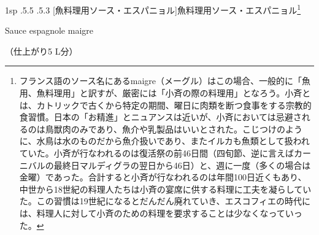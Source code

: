 \documentclass[14Q,a4paperpaper,]{ltjsbook}
\makeatletter
\renewcommand{\headfont}{\gtfamily\sffamily\bfseries}%
\let\footnotes@ve=\footnote
\def\footnote{\inhibitglue\footnotes@ve}
\newenvironment{recette}{\setlength{\parindent}{0pt}\begin{spacing}{0.8}\begin{multicols}{2}\setlength\topskip{.8\baselineskip}}{\end{multicols}\end{spacing}}
\newcommand{\medlarge}{\fontsize{11}{13}\selectfont}
\renewcommand{\subsubsection}{\@startsection{subsubsection}{3}{\z@}%
    {1sp \@plus.5\Cdp \@minus.5\Cdp}%
    {\if@slide .5\Cvs \@plus.3\Cdp \else \z@ \fi}%
    {\normalfont\medlarge\headfont\leftskip -1\zw}}
\newenvironment{frsubenv}{\begin{spacing}{0.2}\setlength{\leftskip}{-1\zw}\bfseries}{\end{spacing}\normalfont\normalsize\setlength{\leftskip}{0pt}\par\vspace{1.1\zw}}
\newcommand{\atoaki}{\vspace{1.25mm}}
\makeatother
\begin{document}
\begin{recette}
\atoaki{}

\hypertarget{sauce-espagnole-maigre}{%
\subsubsection[魚料理用ソース・エスパニョル]{\texorpdfstring{魚料理用ソース・エスパニョル\footnote{フランス語のソース名にあるmaigre（メーグル）はこの場合、一般的に「魚用、魚料理用」と訳すが、厳密には「小斉の際の料理用」となろう。小斉とは、カトリックで古くから特定の期間、曜日に肉類を断つ食事をする宗教的食習慣。日本の「お精進」とニュアンスは近いが、小斉においては忌避されるのは鳥獣肉のみであり、魚介や乳製品はいいとされた。こじつけのように、水鳥は水のものだから魚介扱いであり、またイルカも魚類として扱われていた。小斉が行なわれるのは復活祭の前46日間（四旬節、逆に言えばカーニバルの最終日マルディグラの翌日から46日）と、週に一度（多くの場合は金曜）であった。合計すると小斉が行なわれるのは年間100日近くもあり、中世から18世紀の料理人たちは小斉の宴席に供する料理に工夫を凝らしていた。この習慣は19世紀になるとだんだん廃れていき、エスコフィエの時代には、料理人に対して小斉のための料理を要求することは少なくなっていった。}}{魚料理用ソース・エスパニョル}}\label{sauce-espagnole-maigre}}

\begin{frsubenv}

Sauce espagnole maigre

\end{frsubenv}


（仕上がり5 L分）


\end{recette}
\end{document}
